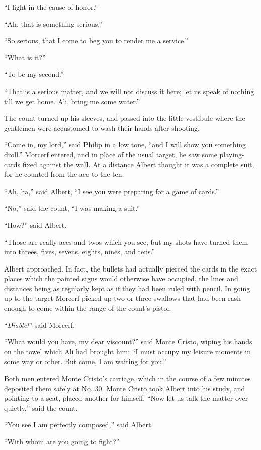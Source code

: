 “I fight in the cause of honor.”

“Ah, that is something serious.”

“So serious, that I come to beg you to render me a service.”

“What is it?”

“To be my second.”

“That is a serious matter, and we will not discuss it here; let us
speak of nothing till we get home. Ali, bring me some water.”

The count turned up his sleeves, and passed into the little vestibule
where the gentlemen were accustomed to wash their hands after shooting.

“Come in, my lord,” said Philip in a low tone, “and I will show you
something droll.” Morcerf entered, and in place of the usual target, he
saw some playing-cards fixed against the wall. At a distance Albert
thought it was a complete suit, for he counted from the ace to the ten.

“Ah, ha,” said Albert, “I see you were preparing for a game of cards.”

“No,” said the count, “I was making a suit.”

“How?” said Albert.

“Those are really aces and twos which you see, but my shots have turned
them into threes, fives, sevens, eights, nines, and tens.”

Albert approached. In fact, the bullets had actually pierced the cards
in the exact places which the painted signs would otherwise have
occupied, the lines and distances being as regularly kept as if they
had been ruled with pencil. In going up to the target Morcerf picked up
two or three swallows that had been rash enough to come within the
range of the count’s pistol.

“\textit{Diable!}” said Morcerf.

“What would you have, my dear viscount?” said Monte Cristo, wiping his
hands on the towel which Ali had brought him; “I must occupy my leisure
moments in some way or other. But come, I am waiting for you.”

Both men entered Monte Cristo’s carriage, which in the course of a few
minutes deposited them safely at No. 30. Monte Cristo took Albert into
his study, and pointing to a seat, placed another for himself. “Now let
us talk the matter over quietly,” said the count.

“You see I am perfectly composed,” said Albert.

“With whom are you going to fight?”

